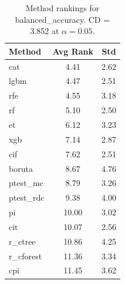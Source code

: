 \begin{table}[h]
\centering
\caption{Method rankings for balanced_accuracy. CD = 3.852 at $\alpha=0.05$.}
\label{tab:ranks_balanced_accuracy}
\begin{tabular}{lcc}
\toprule
Method & Avg Rank & Std \\
\midrule
cat & 4.41 & 2.62 \\
lgbm & 4.47 & 2.51 \\
rfe & 4.55 & 3.18 \\
rf & 5.10 & 2.50 \\
et & 6.12 & 3.23 \\
xgb & 7.14 & 2.87 \\
cif & 7.62 & 2.51 \\
boruta & 8.67 & 4.76 \\
ptest_mc & 8.79 & 3.26 \\
ptest_rdc & 9.38 & 4.00 \\
pi & 10.00 & 3.02 \\
cit & 10.07 & 2.56 \\
r_ctree & 10.86 & 4.25 \\
r_cforest & 11.36 & 3.34 \\
cpi & 11.45 & 3.62 \\
\bottomrule
\end{tabular}
\end{table}